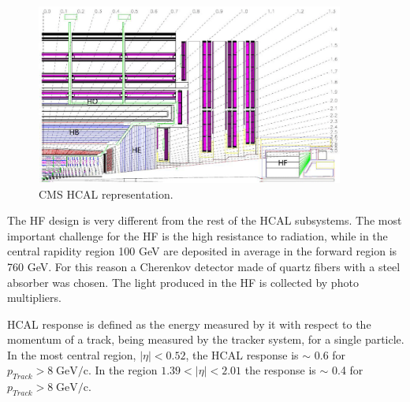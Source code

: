 \begin{figure}[!Hhtbp]
  \begin{center}
    \includegraphics[width=0.9\textwidth]{figs/HCAL.png}
    \caption{CMS HCAL representation. }
    \label{fig:hcal}
  \end{center}
\end{figure}

The HF design is very different from the rest of the HCAL subsystems. The most important challenge for the HF is the high resistance to radiation, while in the central rapidity region 100 GeV are deposited in average in the forward region is 760 GeV. For this reason a Cherenkov detector made of quartz fibers with a steel absorber was chosen. The light produced in the HF is collected by photo multipliers. 

HCAL response is defined as the energy measured by it with respect to the momentum of a track, being measured by the tracker system, for a single particle. In the most central region, $|\eta|<0.52$, the HCAL response is $\sim$ 0.6 for ${p_{Track}>8\;\text{GeV/c}}$. In the region $1.39<|\eta|<2.01$ the response is $\sim$ 0.4 for ${p_{Track}>8\;\text{GeV/c}}$.

%

